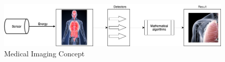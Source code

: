 \begin{figure}
    \centerline{\includegraphics[width=1\columnwidth]{02-related-works/figures/medical-imaging-system-concept.png}}
    \caption{Medical Imaging Concept}
    \label{figure:medical-imaging-system-concept}
\end{figure}